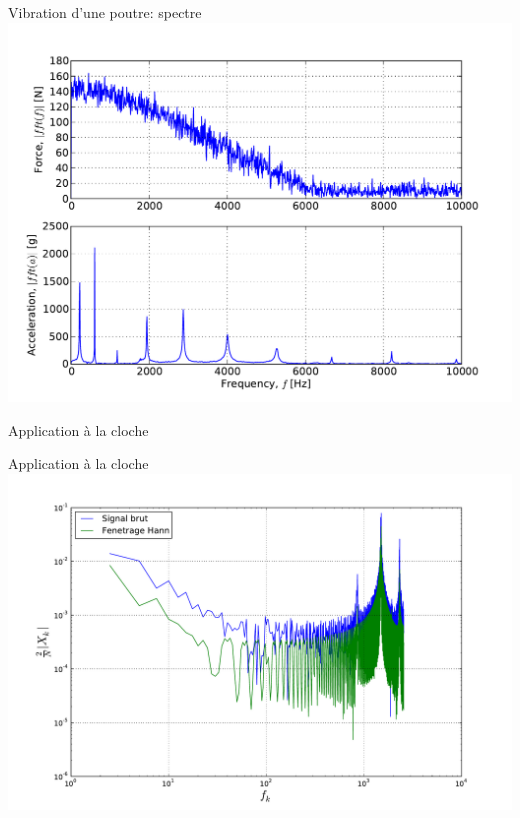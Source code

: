 \documentclass[8pt,a4paper]{beamer}
\begin{document}
\begin{frame}{Vibration d'une poutre: spectre}
\includegraphics[width=.9\textwidth]{../Example_code/flex_vib_spectre.pdf}
\end{frame}


\begin{frame}{Application à la cloche}

\end{frame}

\begin{frame}{Application à la cloche}
\includegraphics[width=1.\textwidth]{figures/FFT_cloche-log.pdf} \\
\end{frame}
\end{document}
